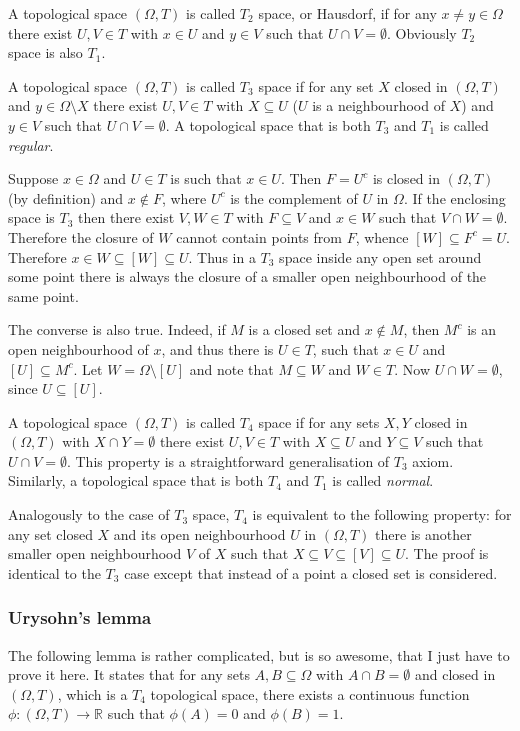 \documentclass[a4paper]{article}
\newcommand{\clo}[1]{\left [{#1}\right]}
\newcommand{\brac}[1]{{\left({#1}\right)}}
\begin{document}
A topological space $\brac{\Omega, T}$ is called $T_2$ space, or Hausdorf, if for any $x\neq y\in \Omega$ there exist $U,V\in T$ with $x\in U$ and $y\in V$ such that $U\cap V = \emptyset$. Obviously $T_2$ space is also $T_1$.

A topological space $\brac{\Omega, T}$ is called $T_3$ space if for any set $X$ closed in $\brac{\Omega, T}$ and $y\in \Omega \setminus X$ there exist $U,V\in T$ with $X\subseteq U$ ($U$ is a neighbourhood of $X$) and $y\in V$ such that $U\cap V = \emptyset$. A topological space that is both $T_3$ and $T_1$ is called \emph{regular}.

Suppose $x\in \Omega$ and $U\in T$ is such that $x\in U$. Then $F=U^c$ is closed in $\brac{\Omega, T}$ (by definition) and $x\notin F$, where $U^c$ is the complement of $U$ in $\Omega$. If the enclosing space is $T_3$ then there exist $V,W\in T$ with $F\subseteq V$ and $x\in W$ such that $V\cap W = \emptyset$. Therefore the closure of $W$ cannot contain points from $F$, whence $\clo{W}\subseteq F^c = U$. Therefore $x\in W\subseteq \clo{W}\subseteq U$. Thus in a $T_3$ space inside any open set around some point there is always the closure of a smaller open neighbourhood of the same point.

The converse is also true. Indeed, if $M$ is a closed set and $x\notin M$, then $M^c$ is an open neighbourhood of $x$, and thus there is $U\in T$, such that $x\in U$ and $\clo{U}\subseteq M^c$. Let $W=\Omega\setminus \clo{U}$ and note that $M\subseteq W$ and $W\in T$. Now $U\cap W = \emptyset$, since $U\subseteq \clo{U}$.

A topological space $\brac{\Omega, T}$ is called $T_4$ space if for any sets $X, Y$ closed in $\brac{\Omega, T}$ with $X\cap Y=\emptyset$ there exist $U,V\in T$ with $X\subseteq U$ and $Y\subseteq V$ such that $U\cap V = \emptyset$. This property is a straightforward generalisation of $T_3$ axiom. Similarly, a topological space that is both $T_4$ and $T_1$ is called \emph{normal}.

Analogously to the case of $T_3$ space, $T_4$ is equivalent to the following property: for any set closed $X$ and its open neighbourhood $U$ in $\brac{\Omega, T}$ there is another smaller open neighbourhood $V$ of $X$ such that $X\subseteq V\subseteq \clo{V}\subseteq U$. The proof is identical to the $T_3$ case except that instead of a point a closed set is considered.


\subsubsection{Urysohn's lemma} %
\label{ssub:urysohn_s_lemma}
The following lemma is rather complicated, but is so awesome, that I just have to prove it here. It states that for any sets $A,B\subseteq \Omega$ with $A\cap B = \emptyset$ and closed in $\brac{\Omega, T}$, which is a $T_4$ topological space, there exists a continuous function $\phi:\brac{\Omega, T}\to \mathbb{R}$ such that $\phi\brac{A}=0$ and $\phi\brac{B}=1$.
\end{document}
